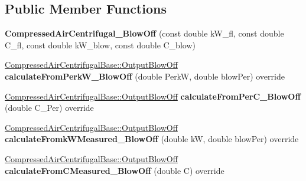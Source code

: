 \subsection*{Public Member Functions}
\begin{DoxyCompactItemize}
\item 
\mbox{\label{class_compressed_air_centrifugal___blow_off_a10619d63e61cde321c4a06c95182a680}} 
{\bfseries Compressed\+Air\+Centrifugal\+\_\+\+Blow\+Off} (const double k\+W\+\_\+fl, const double C\+\_\+fl, const double k\+W\+\_\+blow, const double C\+\_\+blow)
\item 
\mbox{\label{class_compressed_air_centrifugal___blow_off_ae32f209351f002700be6acfef98ed0b1}} 
\hyperlink{struct_compressed_air_centrifugal_base_1_1_output_blow_off}{Compressed\+Air\+Centrifugal\+Base\+::\+Output\+Blow\+Off} {\bfseries calculate\+From\+Perk\+W\+\_\+\+Blow\+Off} (double PerkW, double blow\+Per) override
\item 
\mbox{\label{class_compressed_air_centrifugal___blow_off_a90cc70b78aaa2f99a4166099c33e54c5}} 
\hyperlink{struct_compressed_air_centrifugal_base_1_1_output_blow_off}{Compressed\+Air\+Centrifugal\+Base\+::\+Output\+Blow\+Off} {\bfseries calculate\+From\+Per\+C\+\_\+\+Blow\+Off} (double C\+\_\+\+Per) override
\item 
\mbox{\label{class_compressed_air_centrifugal___blow_off_a81a999fb4839f803d645ca6bda1eea69}} 
\hyperlink{struct_compressed_air_centrifugal_base_1_1_output_blow_off}{Compressed\+Air\+Centrifugal\+Base\+::\+Output\+Blow\+Off} {\bfseries calculate\+Fromk\+W\+Measured\+\_\+\+Blow\+Off} (double kW, double blow\+Per) override
\item 
\mbox{\label{class_compressed_air_centrifugal___blow_off_a35348e798c71e9ccf4900c209587cae8}} 
\hyperlink{struct_compressed_air_centrifugal_base_1_1_output_blow_off}{Compressed\+Air\+Centrifugal\+Base\+::\+Output\+Blow\+Off} {\bfseries calculate\+From\+C\+Measured\+\_\+\+Blow\+Off} (double C) override
\item 
\mbox{\label{class_compressed_air_centrifugal___blow_off_a9bcee586404e8f222f29ed744db2aaf1}} 

\end{DoxyCompactItemize}
